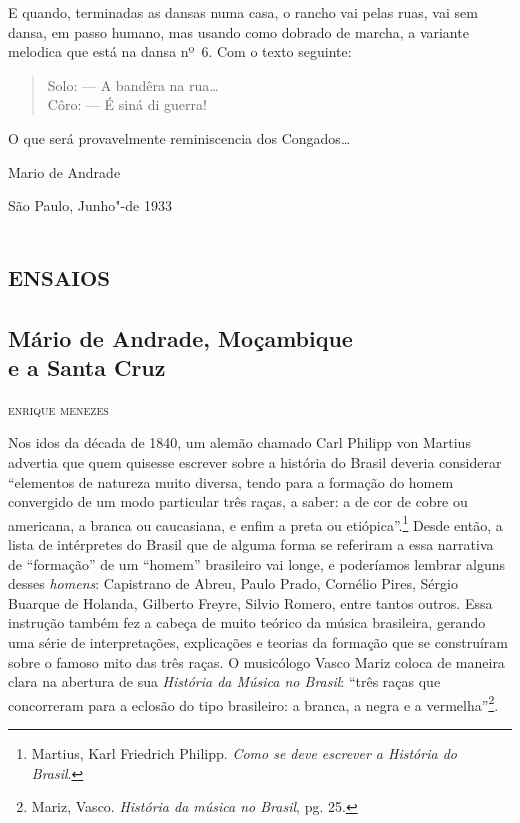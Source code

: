 E quando, terminadas as dansas numa casa, o rancho vai pelas ruas, vai
sem dansa, em passo humano, mas usando como dobrado de marcha, a
variante melodica que está na dansa nº~6. Com o texto seguinte:

\begin{verse}
Solo: --- A bandêra na rua\ldots{}\\
Côro: --- É siná di guerra!\\[5pt]
\end{verse}

\noindent{}O que será provavelmente reminiscencia dos Congados\ldots{}

\bigskip
\begin{flushright}
Mario de Andrade

São Paulo, Junho"-de 1933
\end{flushright}

\part{\textsc{ensaios}}

\chapter*{Mário de Andrade, Moçambique\\ e a Santa Cruz}

\begin{flushright}
\textsc{enrique menezes}
\end{flushright}

Nos idos da década de 1840, um alemão chamado Carl Philipp von Martius
advertia que quem quisesse escrever sobre a história do Brasil deveria
considerar ``elementos de natureza muito diversa, tendo para a formação
do homem convergido de um modo particular três raças, a saber: a de cor
de cobre ou americana, a branca ou caucasiana, e enfim a preta ou
etiópica''.\footnote{Martius, Karl Friedrich Philipp. \emph{Como se deve
  escrever a História do Brasil}.} Desde então, a lista de intérpretes
do Brasil que de alguma forma se referiram a essa narrativa de
``formação'' de um ``homem'' brasileiro vai longe, e poderíamos lembrar
alguns desses \emph{homens}: Capistrano de Abreu, Paulo Prado, Cornélio
Pires, Sérgio Buarque de Holanda, Gilberto Freyre, Silvio Romero, entre
tantos outros. Essa instrução também fez a cabeça de muito teórico da
música brasileira, gerando uma série de interpretações, explicações e
teorias da formação que se construíram sobre o famoso mito das três
raças. O musicólogo Vasco Mariz coloca de maneira clara na abertura de
sua \emph{História da Música no Brasil}: ``três raças que concorreram
para a eclosão do tipo brasileiro: a branca, a negra e a
vermelha''\footnote{Mariz, Vasco. \emph{História da música no Brasil},
  pg. 25.}.

